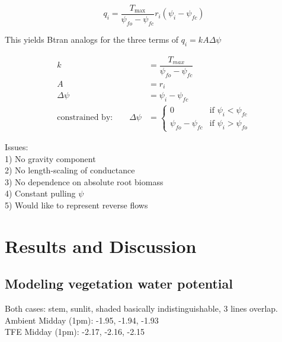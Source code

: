 \documentclass[draft,linenumbers]{agujournal}
\begin{document}
    \begin{linenomath*}
    \begin{equation} 
    q_i = \dfrac{T_{\text{max}}}{\psi_{fo}-\psi_{fc}} r_i \left(\psi_i-\psi_{fc} \right)
    \end{equation}
    \end{linenomath*}
    
    This yields Btran analogs for the three terms of $q_i = kA\Delta\psi$
    \begin{linenomath*}
    \begin{equation} \begin{aligned}
    k &= \dfrac{T_{max}}{\psi_{fo}-\psi_{fc}} \\
    A &= r_i \\
    \Delta\psi &= \psi_i - \psi_{fc} \\
    \mbox{constrained by:} \qquad
    \Delta\psi &=
    \begin{cases}
    0                          & \text{if } \psi_i<\psi_{fc}  \\
    \psi_{fo}-\psi_{fc} & \text{if } \psi_i>\psi_{fo}
    \end{cases}
    \end{aligned}\end{equation}
    \end{linenomath*}
    
    Issues: \\
    1) No gravity component \\
    2) No length-scaling of conductance \\
    3) No dependence on absolute root biomass \\
    4) Constant pulling $\psi$ \\
    5) Would like to represent reverse flows \\
    
\section{Results and Discussion}
\subsection{Modeling vegetation water potential}

Both cases: stem, sunlit, shaded basically indistinguishable, 3 lines overlap. \\
Ambient Midday (1pm): -1.95, -1.94, -1.93 \\
TFE Midday (1pm): -2.17, -2.16, -2.15 \\
\end{document}
